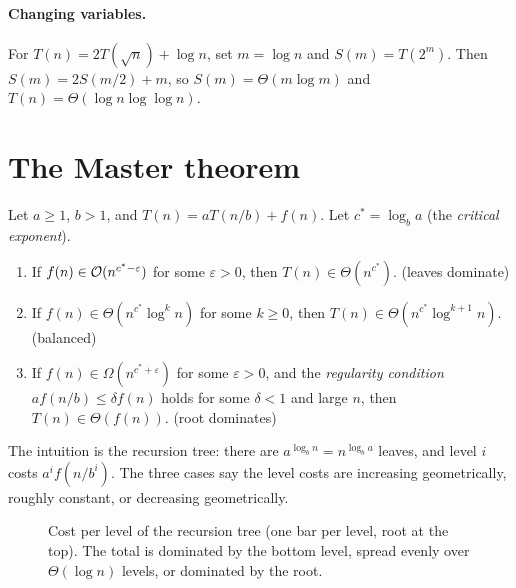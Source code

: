 \paragraph{Changing variables.}
For $T(n)=2T(\sqrt n)+\log n$, set $m=\log n$ and $S(m)=T(2^m)$. Then $S(m)=2S(m/2)+m$, so
$S(m)=\Theta(m\log m)$ and $T(n)=\Theta(\log n\log\log n)$.

\section{The Master theorem}

\begin{theorem}
Let $a\ge1$, $b>1$, and $T(n)=aT(n/b)+f(n)$. Let $c^*=\log_b a$ (the \emph{critical exponent}).
\begin{enumerate}
  \item If $f(n)\in\mathcal{O}(n^{c^*-\varepsilon})$ for some $\varepsilon>0$, then $T(n)\in\Theta(n^{c^*})$. \hfill (leaves dominate)
  \item If $f(n)\in\Theta(n^{c^*}\log^k n)$ for some $k\ge0$, then $T(n)\in\Theta(n^{c^*}\log^{k+1}n)$. \hfill (balanced)
  \item If $f(n)\in\Omega(n^{c^*+\varepsilon})$ for some $\varepsilon>0$, and the \emph{regularity condition}
        $af(n/b)\le \delta f(n)$ holds for some $\delta<1$ and large $n$, then $T(n)\in\Theta(f(n))$. \hfill (root dominates)
\end{enumerate}
\end{theorem}

The intuition is the recursion tree: there are $a^{\log_b n}=n^{\log_b a}$ leaves, and level $i$ costs $a^if(n/b^i)$.
The three cases say the level costs are increasing geometrically, roughly constant, or decreasing geometrically.

\begin{figure}[H]
\centering
{}
\caption{Cost per level of the recursion tree (one bar per level, root at
the top). The total is dominated by the bottom level, spread evenly over
$\Theta(\log n)$ levels, or dominated by the root.}
\end{figure}

